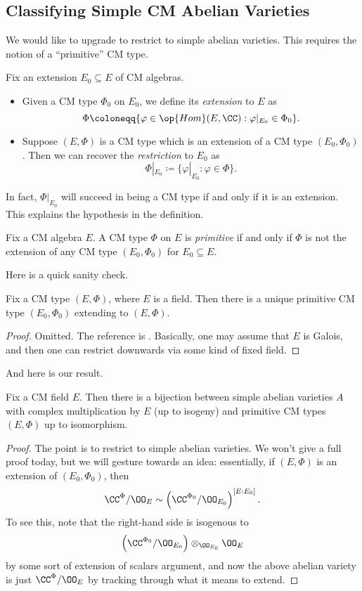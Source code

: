 \documentclass[../notes.tex]{subfiles}
\begin{document}
\subsection{Classifying Simple CM Abelian Varieties}
We would like to upgrade  to restrict to simple abelian varieties. This requires the notion of a ``primitive'' CM type.
\begin{defihelper}  
	Fix an extension $E_0\subseteq E$ of CM algebras.
	\begin{itemize}
		\item Given a CM type $\Phi_0$ on $E_0$, we define its \textit{extension} to $E$ as
		\[\Phi\coloneqq\{\varphi\in\op{Hom}(E,\CC):\varphi|_{E_0}\in\Phi_0\}.\]
		\item Suppose $(E,\Phi)$ is a CM type which is an extension of a CM type $(E_0,\Phi_0)$. Then we can recover the \textit{restriction} to $E_0$ as
		\[\Phi|_{E_0}\coloneqq\{\varphi|_{E_0}:\varphi\in\Phi\}.\]
	\end{itemize}
\end{defihelper}
\begin{remark}
	In fact, $\Phi|_{E_0}$ will succeed in being a CM type if and only if it is an extension. This explains the hypothesis in the definition.
\end{remark}
\begin{definition}[primitive]
	Fix a CM algebra $E$. A CM type $\Phi$ on $E$ is \textit{primitive} if and only if $\Phi$ is not the extension of any CM type $(E_0,\Phi_0)$ for $E_0\subseteq E$.
\end{definition}
Here is a quick sanity check.
\begin{lemma}
	Fix a CM type $(E,\Phi)$, where $E$ is a field. Then there is a unique primitive CM type $(E_0,\Phi_0)$ extending to $(E,\Phi)$.
\end{lemma}
\begin{proof}
	Omitted. The reference is \cite[Proposition~1.9]{milne-cm}. Basically, one may assume that $E$ is Galois, and then one can restrict downwards via some kind of fixed field.
\end{proof}
And here is our result.
\begin{proposition}
	Fix a CM field $E$. Then there is a bijection between simple abelian varieties $A$ with complex multiplication by $E$ (up to isogeny) and primitive CM types $(E,\Phi)$ up to isomorphism.
\end{proposition}
\begin{proof}
	The point is to restrict  to simple abelian varieties. We won't give a full proof today, but we will gesture towards an idea: essentially, if $(E,\Phi)$ is an extension of $(E_0,\Phi_0)$, then
	\[\CC^\Phi/\OO_E\sim\left(\CC^{\Phi_0}/\OO_{E_0}\right)^{[E:E_0]}.\]
	To see this, note that the right-hand side is isogenous to
	\[\left(\CC^{\Phi_0}/\OO_{E_0}\right)\otimes_{\OO_{E_0}}\OO_E\]
	by some sort of extension of scalars argument, and now the above abelian variety is just $\CC^\Phi/\OO_E$ by tracking through what it means to extend.
\end{proof}
\end{document}
